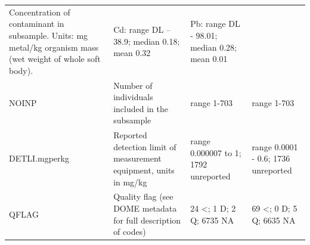 \documentclass[
  12pt,
]{article}
\begin{document}
\begin{longtable}[]{@{}llll@{}}
\begin{minipage}[t]{0.22\columnwidth}
Concentration of contaminant in subsample. Units: mg metal/kg organism
mass (wet weight of whole soft body).\strut
\end{minipage} & \begin{minipage}[t]{0.26\columnwidth}\raggedright
Cd: range DL -- 38.9; median 0.18; mean 0.32\strut
\end{minipage} & \begin{minipage}[t]{0.26\columnwidth}\raggedright
Pb: range DL - 98.01; median 0.28; mean 0.01\strut
\end{minipage}\tabularnewline
\begin{minipage}[t]{0.15\columnwidth}\raggedright
NOINP\strut
\end{minipage} & \begin{minipage}[t]{0.22\columnwidth}\raggedright
Number of individuals included in the subsample\strut
\end{minipage} & \begin{minipage}[t]{0.26\columnwidth}\raggedright
range 1-703\strut
\end{minipage} & \begin{minipage}[t]{0.26\columnwidth}\raggedright
range 1-703\strut
\end{minipage}\tabularnewline
\begin{minipage}[t]{0.15\columnwidth}\raggedright
DETLI.mgperkg\strut
\end{minipage} & \begin{minipage}[t]{0.22\columnwidth}\raggedright
Reported detection limit of measurement equipment, units in mg/kg\strut
\end{minipage} & \begin{minipage}[t]{0.26\columnwidth}\raggedright
range 0.000007 to 1; 1792 unreported\strut
\end{minipage} & \begin{minipage}[t]{0.26\columnwidth}\raggedright
range 0.0001 - 0.6; 1736 unreported\strut
\end{minipage}\tabularnewline
\begin{minipage}[t]{0.15\columnwidth}\raggedright
QFLAG\strut
\end{minipage} & \begin{minipage}[t]{0.22\columnwidth}\raggedright
Quality flag (see DOME metadata for full description of codes)\strut
\end{minipage} & \begin{minipage}[t]{0.26\columnwidth}\raggedright
24 \textless; 1 D; 2 Q; 6735 NA\strut
\end{minipage} & \begin{minipage}[t]{0.26\columnwidth}\raggedright
69 \textless; 0 D; 5 Q; 6635 NA\strut
\end{minipage}\tabularnewline
\bottomrule
\end{longtable}
\end{document}
